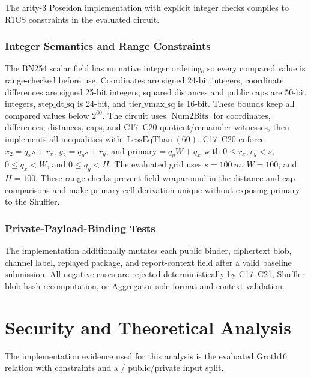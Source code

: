 \documentclass[journal]{IEEEtran}
\theoremstyle{definition}
\theoremstyle{plain}
\begin{document}
The arity-3 Poseidon implementation with explicit integer checks compiles to
\VFourConstraints{} R1CS constraints in the evaluated circuit.

\subsubsection{Integer Semantics and Range Constraints}
\label{sec:integer-semantics}

The BN254 scalar field has no native integer ordering, so every compared value
is range-checked before use. Coordinates are signed 24-bit integers, coordinate
differences are signed 25-bit integers, squared distances and public caps are
50-bit integers, \(\mathrm{step\_dt\_sq}\) is 24-bit, and
\(\mathrm{tier\_vmax\_sq}\) is 16-bit. These bounds keep all compared values
below \(2^{60}\). The circuit uses \(\operatorname{Num2Bits}\) for coordinates,
differences, distances, caps, and C17--C20 quotient/remainder witnesses, then
implements all inequalities with \(\operatorname{LessEqThan}(60)\). C17--C20
enforce \(x_2=q_xs+r_x\), \(y_2=q_ys+r_y\), and
\(\mathrm{primary}=q_yW+q_x\) with \(0\le r_x,r_y<s\), \(0\le q_x<W\), and
\(0\le q_y<H\). The evaluated grid uses \(s=\SI{100}{m}\), \(W=100\), and
\(H=100\). These range checks prevent field wraparound in the distance and cap
comparisons and make primary-cell derivation unique without exposing
\(\mathrm{primary}\) to the Shuffler.

\subsubsection{Private-Payload-Binding Tests}
\label{sec:payload-binding-tests}

The implementation additionally mutates each public binder, ciphertext blob,
channel label, replayed package, and report-context field after a valid
baseline submission. All negative cases are rejected deterministically by
C17--C21, Shuffler \(\mathrm{blob\_hash}\) recomputation, or Aggregator-side
format and context validation.

\section{Security and Theoretical Analysis}
\label{sec:security}

The implementation evidence used for this analysis is the evaluated Groth16
relation with \VFourConstraints{} constraints and a
\VFourPublicInputs{}/\VFourPrivateInputs{} public/private input split.
\end{document}
